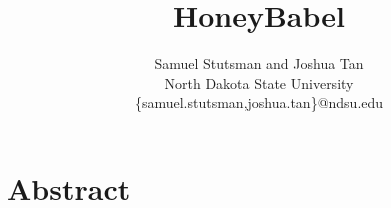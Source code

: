 \documentclass[12pt]{article}
\begin{document}
\pagestyle{plain}

\title{HoneyBabel}

\author{
Samuel Stutsman and Joshua Tan\\
North Dakota State University\\
\{samuel.stutsman,joshua.tan\}@ndsu.edu
}
\date{} 

\maketitle
\thispagestyle{empty}

\section*{\centering Abstract}



% 


% 

% 

% 

\nocite{Juels:2013:HMP:2508859.2516671}
 


\end{document}

